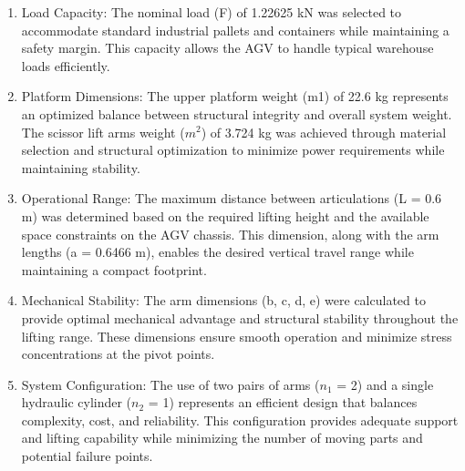 \documentclass[../../main]{subfiles}
\begin{document}
\begin{enumerate}
\def\labelenumi{\arabic{enumi}.}
\item
  Load Capacity: The nominal load (F) of 1.22625 kN was selected to
  accommodate standard industrial pallets and containers while
  maintaining a safety margin. This capacity allows the AGV to handle
  typical warehouse loads efficiently.
\item
  Platform Dimensions: The upper platform weight (m1) of 22.6 kg
  represents an optimized balance between structural integrity and
  overall system weight. The scissor lift arms\textquotesingle{} weight
  ($m^2$) of 3.724 kg was achieved through material selection and
  structural optimization to minimize power requirements while
  maintaining stability.
\item
  Operational Range: The maximum distance between articulations (L = 0.6
  m) was determined based on the required lifting height and the
  available space constraints on the AGV chassis. This dimension, along
  with the arm lengths (a = 0.6466 m), enables the desired vertical
  travel range while maintaining a compact footprint.
\item
  Mechanical Stability: The arm dimensions (b, c, d, e) were calculated
  to provide optimal mechanical advantage and structural stability
  throughout the lifting range. These dimensions ensure smooth operation
  and minimize stress concentrations at the pivot points.
\item
  System Configuration: The use of two pairs of arms ($n_1$ = 2) and a
  single hydraulic cylinder ($n_2$ = 1) represents an efficient design that
  balances complexity, cost, and reliability. This configuration
  provides adequate support and lifting capability while minimizing the
  number of moving parts and potential failure points.
\end{enumerate}
\end{document}

